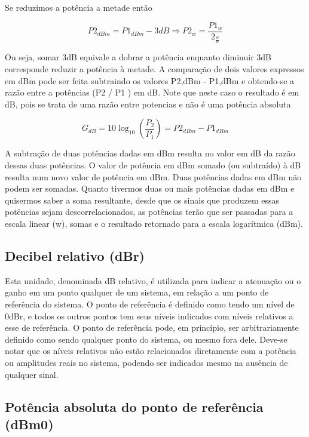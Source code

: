 \documentclass[
	article,			%
	11pt,				%
	oneside,			%
	a4paper,			%
	english,			%
	brazil,				%
	sumario=tradicional
	]{abntex2}
\begin{document}
    Se reduzimos a potência a metade então
    
    \begin{equation}
        {\displaystyle P2_{dBm}} = {\displaystyle P1_{dBm}} - 3dB \Rightarrow {\displaystyle P2_{w}} = \frac{{\displaystyle P1_{w}}}{{\displaystyle 2_{\frac{w}{w}}} } 
    \end{equation}

Ou seja, somar 3dB equivale a dobrar a potência enquanto diminuir 3dB
corresponde reduzir a potência à metade.
A comparação de dois valores expressos em dBm pode ser feita
subtraindo os valores P2,dBm - P1,dBm e obtendo-se a razão entre a potências (P2 / P1 ) em dB. Note que neste caso o resultado é em dB,
pois se trata de uma razão entre potencias e não é uma potência
absoluta

    \begin{equation}
        {\displaystyle G_{dB}} = 10\log_{10}(\frac{{\displaystyle P_{2}}}{\displaystyle P_{1}}) = {\displaystyle P2_{dBm}} - {\displaystyle P1_{dBm}}
    \end{equation}

A subtração de duas potências dadas em dBm resulta no valor em dB
da razão dessas duas potências. O valor de potência em dBm somado
(ou subtraído) à dB resulta num novo valor de potência em dBm. Duas
potências dadas em dBm não podem ser somadas.
Quanto tivermos duas ou mais potências dadas em dBm e quisermos
saber a soma resultante, desde que os sinais que produzem essas
potências sejam descorrelacionados, as potências terão que ser
passadas para a escala linear (w), somas e o resultado retornado para a
escala logarítmica (dBm).

\subsection{Decibel relativo (dBr)}
Esta unidade, denominada dB relativo, é utilizada para indicar a
atenuação ou o ganho em um ponto qualquer de um sistema, em
relação a um ponto de referência do sistema. O ponto de referência é
definido como tendo um nível de 0dBr, e todos os outros pontos tem
seus níveis indicados com níveis relativos a esse de referência. O ponto
de referência pode, em princípio, ser arbitrariamente definido como
sendo qualquer ponto do sistema, ou mesmo fora dele.
Deve-se notar que os níveis relativos não estão relacionados
diretamente com a potência ou amplitudes reais no sistema, podendo
ser indicados mesmo na ausência de qualquer sinal.

\subsection{Potência absoluta do ponto de referência
(dBm0)}
    
\end{document}
